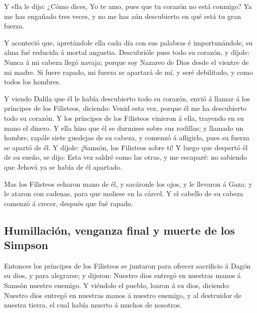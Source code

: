  Y ella le dijo: ¿Cómo dices, Yo te amo, pues que tu
corazón no está conmigo? Ya me has engañado tres veces, y no me has aún
descubierto en qué está tu gran fuerza.

 Y aconteció que, apretándole ella cada día con sus
palabras é importunándole, su alma fué reducida á mortal angustia.
 Descubrióle pues todo su corazón, y díjole: Nunca á mi
cabeza llegó navaja; porque soy Nazareo de Dios desde el vientre de mi
madre. Si fuere rapado, mi fuerza se apartará de mí, y seré debilitado,
y como todos los hombres.

 Y viendo Dalila que él le había descubierto todo su
corazón, envió á llamar á los príncipes de los Filisteos, diciendo:
Venid esta vez, porque él me ha descubierto todo su corazón. Y los
príncipes de los Filisteos vinieron á ella, trayendo en su mano el
dinero.  Y ella hizo que él se durmiese sobre sus
rodillas; y llamado un hombre, rapóle siete guedejas de su cabeza, y
comenzó á afligirlo, pues su fuerza se apartó de él.  Y
díjole: ¡Samsón, los Filisteos sobre ti! Y luego que despertó él de su
sueño, se dijo: Esta vez saldré como las otras, y me escaparé: no
sabiendo que Jehová ya se había de él apartado.

 Mas los Filisteos echaron mano de él, y sacáronle los
ojos, y le llevaron á Gaza; y le ataron con cadenas, para que moliese en
la cárcel.  Y el cabello de su cabeza comenzó á crecer,
después que fué rapado.

\hypertarget{humillaciuxf3n-venganza-final-y-muerte-de-los-simpson}{%
\subsection{Humillación, venganza final y muerte de los
Simpson}\label{humillaciuxf3n-venganza-final-y-muerte-de-los-simpson}}

 Entonces los príncipes de los Filisteos se juntaron para
ofrecer sacrificio á Dagón su dios, y para alegrarse; y dijeron: Nuestro
dios entregó en nuestras manos á Samsón nuestro enemigo. 
Y viéndolo el pueblo, loaron á su dios, diciendo: Nuestro dios entregó
en nuestras manos á nuestro enemigo, y al destruidor de nuestra tierra,
el cual había muerto á muchos de nosotros.

